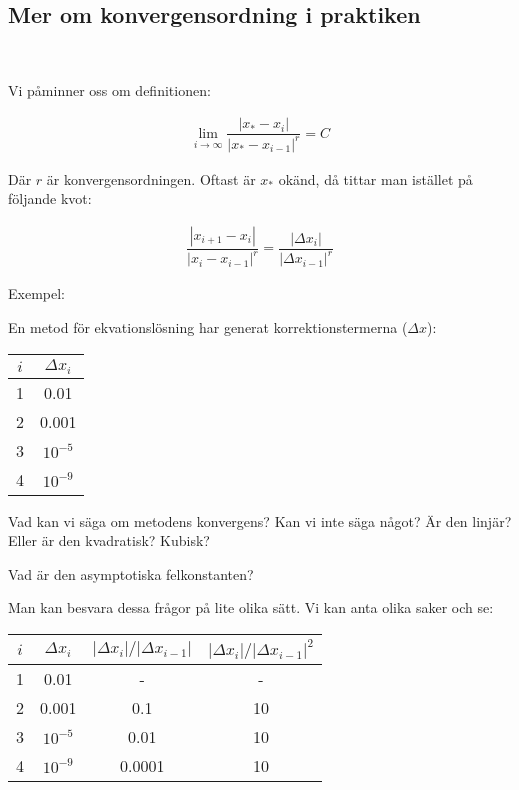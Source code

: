 \subsection{Mer om konvergensordning i praktiken}\hfill\\
\par\bigskip
\noindent Vi påminner oss om definitionen:


\begin{equation*}
  \begin{gathered}
    \lim_{i\to\infty}\dfrac{\left|x_*-x_{i}\right|}{\left|x_*-x_{i-1}\right|^r} = C
  \end{gathered}
\end{equation*}
\par\bigskip
\noindent Där $r$ är konvergensordningen. Oftast är $x_*$ okänd, då tittar man istället på följande kvot:


\begin{equation*}
  \begin{gathered}
    \dfrac{\left|x_{i+1}-x_i\right|}{\left|x_i-x_{i-1}\right|^r} = \dfrac{\left|\Delta x_i\right|}{\left|\Delta x_{i-1}\right|^r}
  \end{gathered}
\end{equation*}
\par\bigskip
\noindent Exempel:\par
\noindent En metod för ekvationslösning har generat korrektionstermerna ($\Delta x$):

\begin{center}
  \begin{tabular}{|c|c|}
    \hline
    $i$&$\Delta x_i$\\
    \hline
    1&0.01\\
    \hline
    2&0.001\\
    \hline
    3&$10^{-5}$\\
    \hline
    4&$10^{-9}$\\
    \hline
  \end{tabular}
\end{center}\par
\noindent Vad kan vi säga om metodens konvergens? Kan vi inte säga något? Är den linjär? Eller är den kvadratisk? Kubisk?\par
\noindent Vad är den asymptotiska felkonstanten?
\par\bigskip
\noindent Man kan besvara dessa frågor på lite olika sätt. Vi kan anta olika saker och se:

\begin{center}
  \begin{tabular}{|c|c|c|c|}
    \hline
    $i$&$\Delta x_i$&$\left|\Delta x_i\right|/\left|\Delta x_{i-1}\right|$&$\left|\Delta x_i\right|/\left|\Delta x_{i-1}\right|^2$\\
    \hline
    1&0.01&-&-\\
    \hline
    2&0.001&0.1&10\\
    \hline
    3&$10^{-5}$&0.01&10\\
    \hline
    4&$10^{-9}$&0.0001&10\\
    \hline
  \end{tabular}
\end{center}\par

